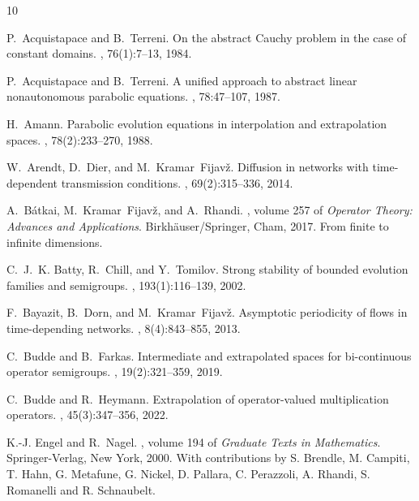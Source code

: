 \documentclass[a4paper,oneside,10pt]{amsart}
\theoremstyle{definition}
\numberwithin{equation}{section}
\begin{document}
\begin{thebibliography}{10}

P.~Acquistapace and B.~Terreni.
\newblock On the abstract {C}auchy problem in the case of constant domains.
,
  76(1):7--13, 1984.

P.~Acquistapace and B.~Terreni.
\newblock A unified approach to abstract linear nonautonomous parabolic
  equations.
, 78:47--107, 1987.

H.~Amann.
\newblock Parabolic evolution equations in interpolation and extrapolation
  spaces.
, 78(2):233--270, 1988.

W.~Arendt, D.~Dier, and M.~Kramar~Fijav{\v{z}}.
\newblock Diffusion in networks with time-dependent transmission conditions.
, 69(2):315--336, 2014.

A.~B\'{a}tkai, M.~Kramar~Fijav\v{z}, and A.~Rhandi.
, volume 257 of {\em Operator
  Theory: Advances and Applications}.
\newblock Birkh\"{a}user/Springer, Cham, 2017.
\newblock From finite to infinite dimensions.

C.~J.~K. Batty, R.~Chill, and Y.~Tomilov.
\newblock Strong stability of bounded evolution families and semigroups.
, 193(1):116--139, 2002.

F.~Bayazit, B.~Dorn, and M.~Kramar~Fijav\v{z}.
\newblock Asymptotic periodicity of flows in time-depending networks.
, 8(4):843--855, 2013.

C.~Budde and B.~Farkas.
\newblock Intermediate and extrapolated spaces for bi-continuous operator
  semigroups.
, 19(2):321--359, 2019.

C.~Budde and R.~Heymann.
\newblock Extrapolation of operator-valued multiplication operators.
, 45(3):347--356, 2022.

K.-J. Engel and R.~Nagel.
, volume
  194 of {\em Graduate Texts in Mathematics}.
\newblock Springer-Verlag, New York, 2000.
\newblock With contributions by S. Brendle, M. Campiti, T. Hahn, G. Metafune,
  G. Nickel, D. Pallara, C. Perazzoli, A. Rhandi, S. Romanelli and R.
  Schnaubelt.


\end{thebibliography}
\end{document}
